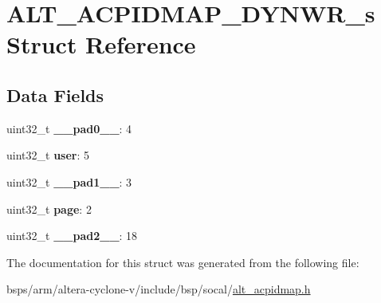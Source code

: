 \hypertarget{structALT__ACPIDMAP__DYNWR__s}{}\section{A\+L\+T\+\_\+\+A\+C\+P\+I\+D\+M\+A\+P\+\_\+\+D\+Y\+N\+W\+R\+\_\+s Struct Reference}
\label{structALT__ACPIDMAP__DYNWR__s}
\subsection*{Data Fields}
\begin{DoxyCompactItemize}
\item 
\mbox{\label{structALT__ACPIDMAP__DYNWR__s_af09f7bdb7c9d4179c8070e07810e547d}} 
uint32\+\_\+t {\bfseries \+\_\+\+\_\+pad0\+\_\+\+\_\+}\+: 4
\item 
\mbox{\label{structALT__ACPIDMAP__DYNWR__s_a857328c9e611094e0d3be4dc4bb3107d}} 
uint32\+\_\+t {\bfseries user}\+: 5
\item 
\mbox{\label{structALT__ACPIDMAP__DYNWR__s_a35200e9dc045a8657e4ae17e940c42c7}} 
uint32\+\_\+t {\bfseries \+\_\+\+\_\+pad1\+\_\+\+\_\+}\+: 3
\item 
\mbox{\label{structALT__ACPIDMAP__DYNWR__s_aba9f1249441890630f49c0dcea465cfb}} 
uint32\+\_\+t {\bfseries page}\+: 2
\item 
\mbox{\label{structALT__ACPIDMAP__DYNWR__s_ab006dab29af61f127f026a02e53b85b5}} 
uint32\+\_\+t {\bfseries \+\_\+\+\_\+pad2\+\_\+\+\_\+}\+: 18
\end{DoxyCompactItemize}


The documentation for this struct was generated from the following file\+:\begin{DoxyCompactItemize}
\item 
bsps/arm/altera-\/cyclone-\/v/include/bsp/socal/\mbox{\hyperlink{alt__acpidmap_8h}{alt\+\_\+acpidmap.\+h}}\end{DoxyCompactItemize}
